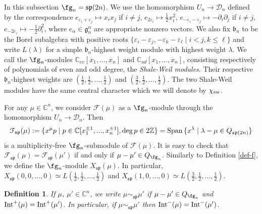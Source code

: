 \documentclass[12pt]{amsart}
\newcommand{\C}{{\mathbb C}}
\def\gb{\mathfrak{b}}
\def\gg{\mathfrak{g}}
\newtheorem{defn}[thm]{Definition}
\begin{document}
In this subsection $\fg_n=\mathfrak{sp}(2n)$.
We use the homomorphism $U_n \to {\mathcal D}_n$ defined by the correspondence $e_{\varepsilon_i + \varepsilon_j} \mapsto x_ix_j$ if $i \neq j$, $e_{2\varepsilon_i} \mapsto \frac{1}{2}x_i^2$, $e_{-\varepsilon_i - \varepsilon_j} \mapsto -\partial_i\partial_j$ if $i \neq j$, $e_{-2\varepsilon_i} \mapsto -\frac{1}{2}\partial_i^2$, where $e_{\alpha} \in \gg_n^{\alpha}$ are appropriate nonzero vectors. We also fix ${\mathfrak b}_n$ to be the Borel subalgebra with positive roots $\{ \varepsilon_i - \varepsilon_j, -\varepsilon_k - \varepsilon_{\ell}\; | \; i<j, k\leq \ell\}$ and write $L(\lambda)$ for a simple $\gb_n$-highest weight module with highest weight $\lambda$. We call the  $\fg_n$-modules ${\mathbb C}_{ev}[x_1,...,x_n]$ and ${\mathbb C}_{od}[x_1,...,x_n]$, consisting respectively of polynomials of even and odd degree, the \emph{Shale-Weil modules}. Their respective ${\mathfrak b}_n$-highest weights are $ \left(\frac{1}{2}, \frac{1}{2},\dots, \frac{1}{2}\right)$ and $\left(\frac{3}{2}, \frac{1}{2},\dots, \frac{1}{2}\right)$. The two Shale-Weil modules have the same central character which we will denote by $\chi_{\rm sw}$.

For any $\mu\in \mathbb{C}^n$, we consider ${\mathcal F} (\mu)$ as a $\fg_n$-module through the homomorphism  $U_n \to {\mathcal D}_{n}$. Then 
$$
{\mathcal F}_{\mathfrak{sp}} (\mu):= \{ x^{\mu} p \; | \; p \in \C [x_1^{\pm1},...,x_{n}^{\pm 1}], \deg p \mbox{}\in 2\mathbb{Z}\} = {\rm Span}\, \{ x^{\lambda} \; | \; \lambda - \mu \in Q_{\mathfrak{sp} (2n)}\}$$
is a multiplicity-free $\fg_n$-submodule of ${\mathcal F} (\mu)$. It is easy to check that ${\mathcal F}_{\mathfrak{sp}} (\mu) = {\mathcal F}_{\mathfrak{sp}} (\mu')$ if and only if $\mu - \mu' \in Q_{\fg_n}$. Similarly to Definition \ref{def-f}, we define the $\fg_n$-module $X_{\mathfrak{sp}} (\mu)$. In particular, $X_{\mathfrak{sp}}(0,0,...,0) \simeq L\left(\frac{1}{2}, \frac{1}{2},\dots, \frac{1}{2}\right)$ and $X_{\mathfrak{sp}}(1,0,...,0) \simeq L\left(\frac{3}{2}, \frac{1}{2},\dots, \frac{1}{2}\right)$. 



\begin{defn}
If $\mu$, $\mu'\in \C^{n}$, we write $\mu \sim_{\mathfrak{sp}} \mu'$ if 
$\mu - \mu' \in Q_{\fg_n}$ and  ${\rm Int}^+ (\mu) = {\rm Int}^+ (\mu')$. In particular, if  $\mu \sim_{\mathfrak{sp}} \mu'$ then ${\rm Int}^- (\mu) = {\rm Int}^- (\mu')$.
\end{defn}
\end{document}
